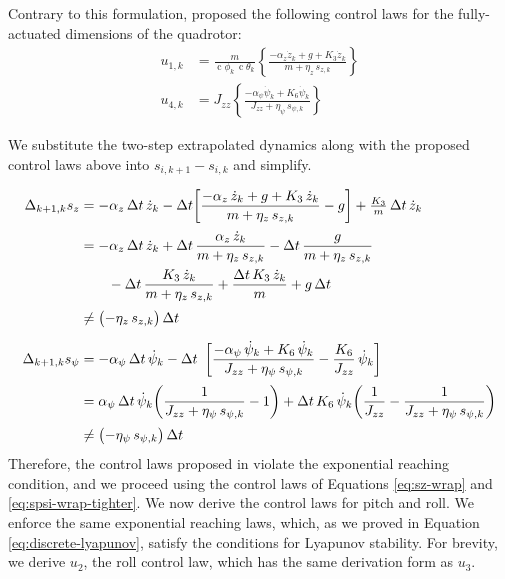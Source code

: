 \documentclass[conf]{new-aiaa}
\DeclareMathOperator{\cs}{c}
\begin{document}
Contrary to this formulation, \cite{refs:Xiong2016} proposed the following control laws for the fully-actuated dimensions of the quadrotor:
\begin{align}
u_{1,k} &= \frac{m}{\cs\phi_k\,\cs\theta_k}
\left\{ \frac{-\alpha_z \dot z_k + g + K_3 \dot z_k}{m + \eta_z\, s_{z,k}} \right\} \\[2pt]
u_{4,k} &= J_{zz}
\left\{ \frac{-\alpha_\psi \dot\psi_k + K_6 \dot\psi_k}{J_{zz} + \eta_\psi\, s_{\psi,k}} \right\}
\end{align}

We substitute the two-step extrapolated dynamics along with the proposed control laws above into $s_{i,k+1} - s_{i,k}$ and simplify.

\begingroup
\small
\setlength{\jot}{0.5pt}
\begin{align}
\Delta_{k+1,k}s_{z}
&= -\alpha_z\,\Delta t\,\dot z_k - \Delta t\!\left[ \frac{-\alpha_z\,\dot z_k + g + K_3\,\dot z_k}{m + \eta_z\,s_{z,k}} - g \right] + \tfrac{K_3}{m}\,\Delta t\,\dot z_k \notag \\[2pt]
&= -\alpha_z\,\Delta t\,\dot z_k + \Delta t\,\frac{\alpha_z\,\dot z_k}{m+\eta_z\,s_{z,k}} - \Delta t\,\frac{g}{m+\eta_z\,s_{z,k}} \notag \\
&\qquad - \Delta t\,\frac{K_3\,\dot z_k}{m+\eta_z\,s_{z,k}} + \frac{\Delta t\,K_3\,\dot z_k}{m} + g\,\Delta t \notag \\[2pt]
&\neq \bigl(-\eta_z\,s_{z,k}\bigr)\,\Delta t \\[6pt]
\Delta_{k+1,k}s_{\psi}
&= -\alpha_\psi\,\Delta t\,\dot\psi_k - \Delta t\ \left[ \frac{-\alpha_\psi\,\dot\psi_k + K_6\,\dot\psi_k}{J_{zz} + \eta_\psi\,s_{\psi,k}} - \frac{K_6}{J_{zz}}\,\dot\psi_k \right] \notag \\[2pt]
&= \alpha_\psi\,\Delta t\,\dot\psi_k\!\left(\frac{1}{J_{zz}+\eta_\psi\,s_{\psi,k}} - 1\right) + \Delta t\,K_6\,\dot\psi_k\!\left(\frac{1}{J_{zz}} - \frac{1}{J_{zz}+\eta_\psi\,s_{\psi,k}}\right) \notag \\[2pt]
&\neq \bigl(-\eta_\psi\,s_{\psi,k}\bigr)\,\Delta t
\end{align}
\endgroup
Therefore, the control laws proposed in \cite{refs:Xiong2016} violate the exponential reaching condition, and we proceed using the control laws of Equations \ref{eq:sz-wrap} and \ref{eq:spsi-wrap-tighter}. We now derive the control laws for pitch and roll. We enforce the same exponential reaching laws, which, as we proved in Equation \ref{eq:discrete-lyapunov}, satisfy the conditions for Lyapunov stability. For brevity, we derive $u_2$, the roll control law, which has the same derivation form as $u_3$.
\end{document}
